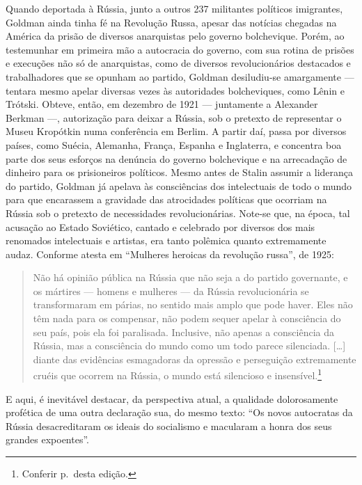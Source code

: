 Quando deportada à Rússia, junto a outros 237
militantes políticos imigrantes, Goldman ainda tinha fé na Revolução
Russa, apesar das notícias chegadas na América da prisão de diversos
anarquistas pelo governo bolchevique. Porém, ao testemunhar em
primeira mão a autocracia do governo, com sua rotina de prisões e
execuções não só de anarquistas, como de diversos revolucionários
destacados e trabalhadores que se opunham ao partido,
Goldman desiludiu-se amargamente --- tentara mesmo apelar diversas vezes às autoridades bolcheviques, como Lênin e Trótski.
Obteve, então, em dezembro de 1921 --- juntamente a Alexander
Berkman ---, autorização para deixar a Rússia, sob o pretexto de
representar o Museu Kropótkin numa conferência em Berlim. A partir daí,
passa por diversos países, como Suécia, Alemanha, França, Espanha e
Inglaterra, e concentra boa parte dos seus esforços na denúncia do
governo bolchevique e na arrecadação de dinheiro para os prisioneiros
políticos. Mesmo antes de Stalin assumir a liderança do partido, Goldman
já apelava às consciências dos intelectuais de todo o mundo para que
encarassem a gravidade das atrocidades políticas que ocorriam
na Rússia sob o pretexto de necessidades revolucionárias. Note-se
que, na época, tal acusação ao Estado Soviético, cantado e
celebrado por diversos dos mais renomados intelectuais e artistas, era
tanto polêmica quanto extremamente audaz. Conforme atesta
em ``Mulheres heroicas da revolução russa'', de 1925:

\begin{quote}
Não há opinião pública na Rússia que não seja a do partido governante, e
os mártires --- homens e mulheres --- da Rússia revolucionária se
transformaram em párias, no sentido mais amplo que pode haver. Eles não
têm nada para os compensar, não podem sequer apelar à consciência do seu
país, pois ela foi paralisada. Inclusive, não apenas a consciência da
Rússia, mas a consciência do mundo como um todo parece silenciada.
{[}\ldots{]} diante das evidências esmagadoras da opressão e perseguição
extremamente cruéis que ocorrem na Rússia, o mundo está silencioso e
insensível.\footnote{Conferir p.\,\pageref{ref2} desta edição.}
\end{quote}

E aqui, é inevitável destacar, da perspectiva atual, a
qualidade dolorosamente profética de uma outra declaração sua, do mesmo texto: ``Os novos autocratas da Rússia desacreditaram os
ideais do socialismo e macularam a honra dos seus grandes expoentes''.

